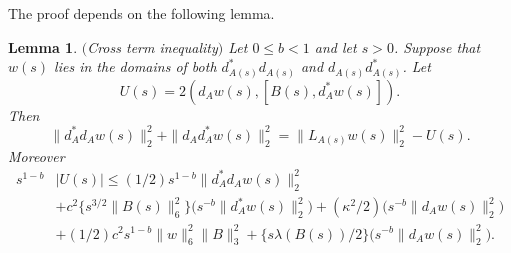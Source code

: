 \documentclass[12pt]{article}
\newtheorem{lemma}[theorem]{Lemma}
\def \beq{\begin{equation}}
\def \eeq{\end{equation}}
\numberwithin{equation}{section}
\begin{document}
The proof depends on the following lemma.
\begin{lemma} \label{crossterms} $($Cross term inequality$)$
Let $0 \le b <1$ and let  $ s >0$.  
 Suppose that $w(s)$ lies in the domains of 
both $d_{A(s)}^* d_{A(s)}$ and $d_{A(s)}d_{A(s)}^*$. 
Let
\beq
U(s)= 2 ( d_A w(s), [B(s), d_A^* w(s)])        .                         \label{ib4b}
\eeq
Then 
\beq
\|d_A^* d_A w(s)\|_2^2 + \|d_A d_A^* w(s)\|_2^2 
            = \| L_{A(s)} w(s)\|_2^2 - U(s) .
                                                    \label{ib5b}
\eeq
Moreover 
\begin{align}
s^{1-b}& 
    |U(s)| \le (1/2)s^{1-b} \|d_A^*d_A w(s)\|_2^2                                 \label{ib8b.0}\\
&
+c^2 \Big\{s^{3/2} \| B(s)\|_6^2 \Big\} \Big( s^{-b} \| d_A^* w(s) \|_2^2 \Big) 
+(\kappa^2/2) \Big( s^{-b} \| d_A w(s)\|_2^2\Big)                                          \label{ib8b.1}\\
 &+ (1/2)c^2 s^{1-b}\|w\|_6^2 \| B\|_3^2  
        + \Big\{s\lambda(B(s))/2\Big\}\Big(s^{-b} \| d_A w(s) \|_2^2\Big).              \label{ib9b} 
\end{align}
\end{lemma}      
\end{document}
